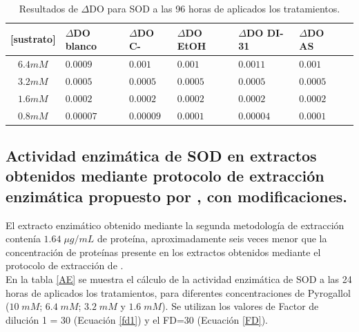 \begin{table}[h]
	\caption{Resultados de $\Delta$DO para SOD a las 96 horas de aplicados los tratamientos.}
	\label{96hSOD}
	\begin{center}
		\begin{tabular}{|c|M{25mm}|M{25mm}|M{25mm}|M{25mm}|M{25mm}|c|}
			\hline 
			\textbf{[sustrato]} & \textbf{$\Delta$DO blanco} & \textbf{$\Delta$DO C-} & \textbf{$\Delta$DO EtOH} & \textbf{$\Delta$DO DI-31} & \textbf{$\Delta$DO AS} \\ 
			\hline 
			$6.4mM$ &  $0.0009$ & $0.001$  & $0.001$ & $0.0011$ & $0.001$ \\ 
			\hline 
			$3.2mM$ &  $0.0005$ & $0.0005$  & $0.0005$ & $0.0005$ & $0.0005$ \\ 
			\hline 
			$1.6mM$ &  $0.0002$ & $0.0002$  & $0.0002$ & $0.0002$ & $0.0002$ \\
			\hline 
			$0.8mM$ &  $0.00007$ & $0.00009$  & $0.0001$ & $0.00004$ & $0.0001$ \\
			\hline
		\end{tabular} 
	\end{center}
\end{table} 

\normalsize

\pagebreak

\subsection{Actividad enzim\'atica de SOD en extractos obtenidos mediante protocolo de extracci\'on enzim\'atica propuesto por \cite{baquero2005catalase}, con modificaciones.}

El extracto enzim\'atico obtenido mediante la segunda metodolog\'ia de extracci\'on conten\'ia $1.64\;\mu g/mL$ de prote\'ina, aproximadamente seis veces menor que la concentraci\'on de prote\'inas presente en los extractos obtenidos mediante el protocolo de extracci\'on de \cite{liu2010exogenous}.\\

En la tabla \ref{AE} se muestra el c\'alculo de la actividad enzim\'atica de SOD a las 24 horas de aplicados los tratamientos, para diferentes concentraciones de Pyrogallol ($10\;mM$; $6.4\;mM$; $3.2\;mM$ y $1.6\;mM$). Se utilizan los valores de Factor de diluci\'on 1 = 30 (Ecuaci\'on \ref{fd1}) y el FD=30 (Ecuaci\'on \ref{FD}).\\

